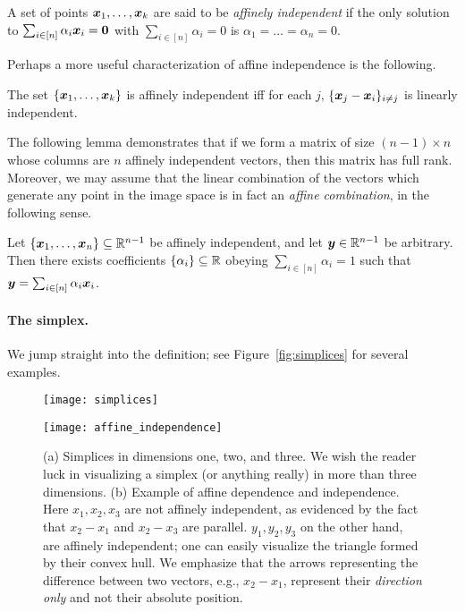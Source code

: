 \begin{definition}
	\label{def:affine_independence}
A set of points $\vb*{x}_1,\dots,\vb*{x}_k$ are said to be \emph{affinely independent} if the only solution to $\sum_{i\in[n]}\alpha_i\vb*{x}_i=\vb{0}$ with $\sum_{i\in [n]}\alpha_i=0$ is $\alpha_1=\dots=\alpha_n=0$. 
\end{definition}

Perhaps a more useful characterization of affine independence is the following. 

\begin{lemma}
	\label{lem:affine-linearly-independent}
	The set $\{\vb*{x}_1,\dots,\vb*{x}_k\}$ is affinely independent iff for each $j$, $\{\vb*{x}_j-\vb*{x}_i\}_{i\neq j}$ is linearly independent. 
\end{lemma}

The following lemma demonstrates that if we form a matrix of size $(n-1)\times n$ whose columns are  $n$ affinely independent vectors, then this matrix has full rank. Moreover, we may assume that the linear combination of the vectors which  generate any point in the image space is in fact an \emph{affine combination}, in the  following sense. 

\begin{lemma}
	\label{lem:barycentric_coeffs}
	Let $\{\vb*{x}_1,\dots,\vb*{x}_n\}\subseteq\mathbb{R}^{n-1}$ be affinely independent, and let  $\vb*{y}\in\mathbb{R}^{n-1}$ be arbitrary. Then there exists coefficients $\{\alpha_i\}\subseteq\mathbb{R}$ obeying $\sum_{i\in[n]}\alpha_i=1$ such that $\vb*{y}=\sum_{i\in[n]}\alpha_i\vb*{x}_i$. 
\end{lemma}

\paragraph{The simplex.} 
We jump straight into the definition; see Figure~\ref{fig:simplices} for several examples. 
\begin{figure}
	\centering
	\begin{minipage}{0.45\textwidth}
		\texttt{[image: simplices]}
		\subcaption{}
		\label{fig:simplices}
	\end{minipage}
	\hspace{0.08\textwidth}
	\begin{minipage}{0.45\textwidth}
		\flushright
		\texttt{[image: affine\_independence]}
		\subcaption{}
		\label{fig:affine_independence}
	\end{minipage}
	\caption{(a) Simplices in dimensions one, two, and three. We wish the reader luck in visualizing a simplex (or anything really) in more than three dimensions. (b) Example of affine dependence and independence.  Here $x_1,x_2,x_3$ are not affinely independent, as evidenced by the fact that $x_2-x_1$ and $x_2-x_3$ are parallel. $y_1,y_2,y_3$ on the other hand, are affinely independent; one can easily visualize the triangle formed by their convex hull. We emphasize that the arrows representing the difference between two vectors, e.g., $x_2-x_1$, represent their \emph{direction only} and  not their absolute position.} 
	\label{fig:simplex+independence}
\end{figure}



